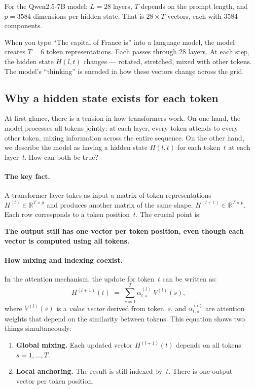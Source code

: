 \documentclass[11pt, twoside, openright]{memoir}
\numberwithin{equation}{chapter}
\begin{document}
For the Qwen2.5-7B model: $L = 28$ layers, $T$ depends on the prompt
length, and $p = 3584$ dimensions per hidden state.  That is
$28 \times T$ vectors, each with 3584 components.

\begin{transformer}
When you type ``The capital of France is'' into a language model, the
model creates $T = 6$ token representations.  Each passes through 28
layers.  At each step, the hidden state $H(l, t)$ changes --- rotated,
stretched, mixed with other tokens.  The model's ``thinking'' is encoded
in how these vectors change across the grid.
\end{transformer}

\subsection{Why a hidden state exists for each token}
\label{sec:why-per-token}

At first glance, there is a tension in how transformers work.
On one hand, the model processes all tokens jointly: at each layer,
every token attends to every other token, mixing information across
the entire sequence.  On the other hand, we describe the model as
having a hidden state $H(l,t)$ for each token~$t$ at each layer~$l$.
How can both be true?

\paragraph{The key fact.}
A transformer layer takes as input a matrix of token representations
$H^{(l)} \in \mathbb{R}^{T \times p}$ and produces another matrix of the
same shape, $H^{(l+1)} \in \mathbb{R}^{T \times p}$.  Each row
corresponds to a token position~$t$.  The crucial point is:

\begin{keyidea}
\textbf{The output still has one vector per token position, even though
each vector is computed using all tokens.}
\end{keyidea}

\paragraph{How mixing and indexing coexist.}
In the attention mechanism, the update for token~$t$ can be written as:
\begin{equation}
\label{eq:attention-update}
  H^{(l+1)}(t)
  \;=\;
  \sum_{s=1}^{T} \alpha_{t,s}^{(l)} \; V^{(l)}(s),
\end{equation}
where $V^{(l)}(s)$ is a \emph{value vector} derived from token~$s$, and
$\alpha_{t,s}^{(l)}$ are attention weights that depend on the similarity
between tokens.  This equation shows two things simultaneously:
\begin{enumerate}
  \item \textbf{Global mixing.}
    Each updated vector $H^{(l+1)}(t)$ depends on all tokens
    $s = 1,\dots,T$.
  \item \textbf{Local anchoring.}
    The result is still indexed by~$t$.  There is one output vector
    per token position.
\end{enumerate}
\end{document}
